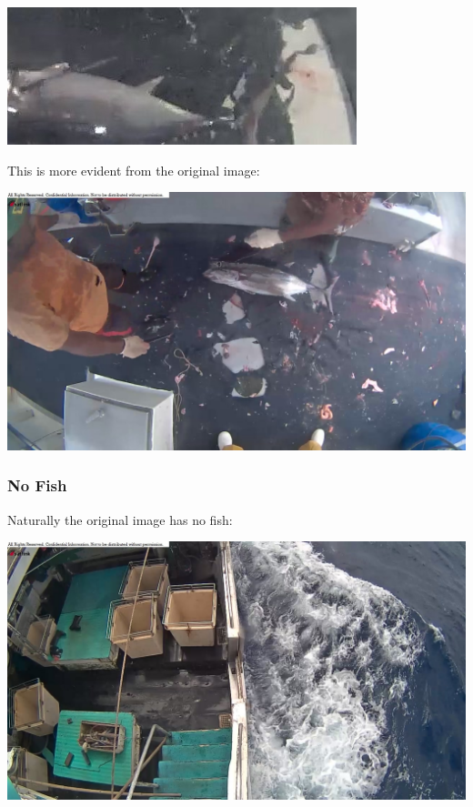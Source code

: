 \documentclass[12pt,a4paper,oneside,headinclude]{scrartcl}
\numberwithin{figure}{section}
\numberwithin{equation}{section}
\numberwithin{table}{section}
\begin{document}
\begin{center}
\includegraphics[width=.9\linewidth]{img/Quality/albLabelpoor07917_2019-06-22_12-57-43.jpg}
\end{center}

This is more evident from the original image:

\begin{center}
\includegraphics[width=.9\linewidth]{img/Quality/albLabel07917orig_2019-06-22_12-57-57.jpg}
\end{center}

\subsubsection{No Fish}
\label{sec:org3f4e828}
Naturally the original image has no fish:

\begin{center}
\includegraphics[width=.9\linewidth]{img/Quality/nofish_00008-labelOrig_2019-06-22_12-58-24.jpg}
\end{center}
\end{document}
